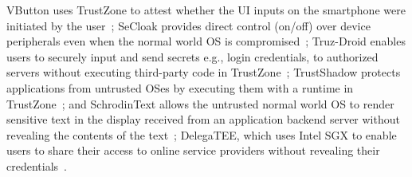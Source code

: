 VButton uses TrustZone to attest whether the UI
inputs on the smartphone were initiated by the user~\cite{li18vbutton}; SeCloak
provides direct control (on/off) over device peripherals even when the normal
world OS is compromised~\cite{lentz18secloak}; Truz-Droid enables users to
securely input and send secrets e.g., login credentials, to authorized servers
without executing third-party code in TrustZone~\cite{ying18truzdroid};
TrustShadow protects applications from untrusted OSes by executing them with a
runtime in TrustZone~\cite{guan17trustshadow}; and SchrodinText allows the
untrusted normal world OS to render sensitive text in the display received from
an application backend server without revealing the contents of the
text~\cite{sani17schrodintext}; DelegaTEE, which uses Intel SGX to enable users
to share their access to online service providers without revealing their
credentials~\cite{matetic18delegatee}.

